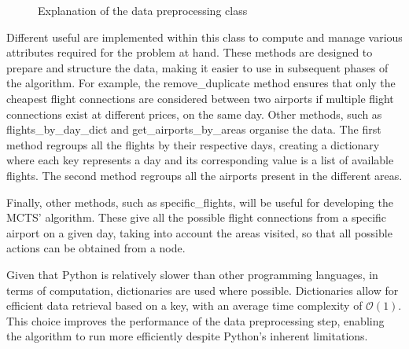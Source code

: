 \documentclass[conference]{IEEEtran}
\begin{document}
\begin{figure}
{
    }
    \caption{Explanation of the data preprocessing class}
    \label{fig:data_preprocessing_class}
\end{figure}

Different useful  are implemented within this class to compute and manage various attributes required for the problem at hand. These methods are designed to prepare and structure the data, making it easier to use in subsequent phases of the algorithm. 
For example, the remove\_duplicate method ensures that only the cheapest flight connections are considered between two airports if multiple flight connections exist at different prices, on the same day. 
Other methods, such as flights\_by\_day\_dict and get\_airports\_by\_areas organise the data. The first method regroups all the flights by their respective days, creating a dictionary where each key represents a day and its corresponding value is a list of available flights. The second method regroups all the airports present in the different areas.

Finally, other methods, such as specific\_flights, will be useful for developing the MCTS' algorithm. These give all the possible flight connections from a specific airport on a given day, taking into account the areas visited, so that all possible actions can be obtained from a node.

Given that Python is relatively slower than other programming languages, in terms of computation, dictionaries are used where possible. Dictionaries allow for efficient data retrieval based on a key, with an average time complexity of $\mathcal{O}(1)$. This choice improves the performance of the data preprocessing step, enabling the algorithm to run more efficiently despite Python’s inherent limitations.
\end{document}

